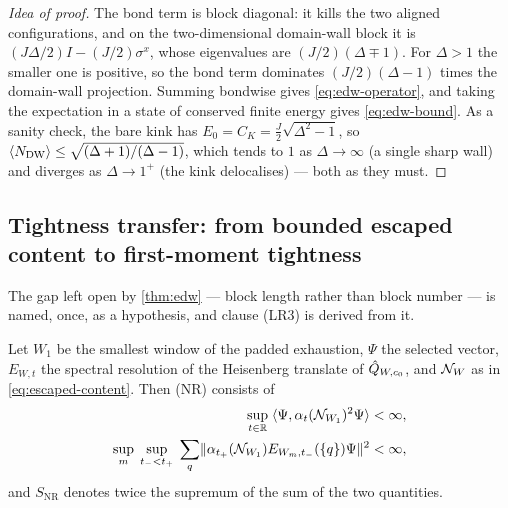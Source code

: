\begin{proof}[Idea of proof]
The bond term is block diagonal: it kills the two aligned configurations, and
on the two-dimensional domain-wall block it is
$(J\Delta/2)I-(J/2)\sigma^x$, whose eigenvalues are $(J/2)(\Delta\mp1)$. For
$\Delta>1$ the smaller one is positive, so the bond term dominates
$(J/2)(\Delta-1)$ times the domain-wall projection. Summing bondwise gives
\eqref{eq:edw-operator}, and taking the expectation in a state of conserved
finite energy gives \eqref{eq:edw-bound}. As a sanity check, the bare kink has
$E_0=C_K=\tfrac{J}{2}\sqrt{\Delta^2-1}$, so
$\langle N_{\mathrm{DW}}\rangle\le\sqrt{(\Delta+1)/(\Delta-1)}$, which tends to $1$ as
$\Delta\to\infty$ (a single sharp wall) and diverges as $\Delta\to1^+$ (the
kink delocalises) --- both as they must.
\end{proof}


\subsection{Tightness transfer: from bounded escaped content to first-moment tightness}
\label{subsec:nr-transfer}

The gap left open by \cref{thm:edw} --- block length rather than block number
--- is named, once, as a hypothesis, and clause (LR3) is derived from it.

\begin{definition}
\label{def:nr}
Let $W_1$ be the smallest window of the padded exhaustion, $\Psi$ the selected
vector, $E_{W,t}$ the spectral resolution of the Heisenberg translate of
$\hat{Q}_{W,c_0}$, and $\mathcal{N}_{W}$ as in \eqref{eq:escaped-content}. Then (NR)
consists of
\begin{align}
  \sup_{t\in\mathbb{R}}\;\langle \Psi,\alpha_t(\mathcal{N}_{W_1})^2\Psi\rangle&<\infty,
  \label{eq:nr-clause-1}\\
  \sup_m\;\sup_{t_-<t_+}\;\sum_q
  \lVert \alpha_{t_+}(\mathcal{N}_{W_1})E_{W_m,t_-}(\{q\})\Psi\rVert^2&<\infty,
  \label{eq:nr-clause-2}
\end{align}
and $S_{\mathrm{NR}}$ denotes twice the supremum of the sum of the two
quantities.
\end{definition}

